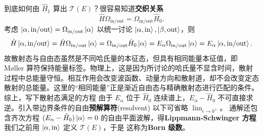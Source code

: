 到底如何由 $\hat H_1$ 算出 $\mathcal T(E)$？很容易知道\textbf{交织关系}
\[ \hat H\Omega_{\mathrm{in/out}} = \Omega_{\mathrm{in/out}}\hat H_0. \]
考虑 $\ket{\alpha,\mathrm{in/out}} = \Omega_{\mathrm{in/out}}\ket{\alpha}$ 以统一讨论 $\ket{\alpha,\mathrm{in}},\ket{\beta,\mathrm{out}}$，则
\[\hat H\ket{\alpha,\mathrm{in/out}} =\hat H\Omega_{\mathrm{in/out}}\ket{\alpha}=\Omega_{\mathrm{in/out}}\hat H_0\ket{\alpha}=E_\alpha\Omega_{\mathrm{in/out}}\ket{\alpha}=E_\alpha\ket{\alpha,\mathrm{in/out}}.\]
故散射态与自由态虽然是不同哈氏量的本征态，但具有相同能量本征值，即 M\o ller 算符保持能量标签。物理上，这是因为所讨论的哈氏量不显含时间，散射过程中总能量守恒。相互作用会改变波函数、动量方向和散射道，却不会改变定态散射的总能量。这里的“相同能量”正是渐近自由态与精确散射态进行匹配的条件。
综上，写下散射态满足的方程
由于 $E_\alpha$ 位于 $\hat H_0$ 连续谱上，$E_\alpha-\hat H_0$ 不可直接求逆。引入带边界条件的自由\textbf{预解算符}(resolvent)
以下可省略 $\lim_{\epsilon\to0^+}$。
通解还包含齐次方程 $(E_\alpha-\hat H_0)\ket{\alpha}=0$ 的自由平面波解，得\textbf{Lippmann-Schwinger 方程}
我们之前用 $\ket{\alpha,\mathrm{in}}$ 定义 $\mathcal T(E)$，于是
这称为\textbf{Born 级数}。

